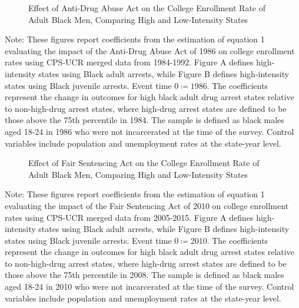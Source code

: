 \clearpage 

\begin{figure}[h]
  \centering
  \caption{Effect of Anti-Drug Abuse Act on the College Enrollment Rate of Adult Black Men, Comparing High and Low-Intensity States}%
  \qquad
  \label{fig:rs_es_1986}%
\end{figure}

\begin{footnotesize}
  \noindent Note: These figures report coefficients from the estimation of equation 1 evaluating the impact of the Anti-Drug Abuse Act of 1986 on college enrollment rates using CPS-UCR merged data from 1984-1992. Figure A defines high-intensity states using Black adult arrests, while Figure B defines high-intensity states using Black juvenile arrests. Event time $0 \coloneqq 1986$. The coefficients represent the change in outcomes for high black adult drug arrest states relative to non-high-drug arrest states, where high-drug arrest states are defined to be those above the 75th percentile in 1984. The sample is defined as black males aged 18-24 in 1986 who were not incarcerated at the time of the survey. Control variables include population and unemployment rates at the state-year level. 
\end{footnotesize}

\clearpage

\begin{figure}[h]
  \centering
  \caption{Effect of Fair Sentencing Act on the College Enrollment Rate of Adult Black Men, Comparing High and Low-Intensity States}%
  \qquad
  \label{fig:rf_jb_es_2010}%
\end{figure}

\begin{footnotesize}
  \noindent Note: These figures report coefficients from the estimation of equation 1 evaluating the impact of the Fair Sentencing Act of 2010 on college enrollment rates using CPS-UCR merged data from 2005-2015. Figure A defines high-intensity states using Black adult arrests, while Figure B defines high-intensity states using Black juvenile arrests. Event time $0 \coloneqq 2010$. The coefficients represent the change in outcomes for high black adult drug arrest states relative to non-high-drug arrest states, where high-drug arrest states are defined to be those above the 75th percentile in 2008. The sample is defined as black males aged 18-24 in 2010 who were not incarcerated at the time of the survey. Control variables include population and unemployment rates at the state-year level. 
\end{footnotesize}

